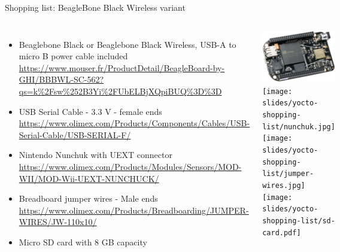 \begin{frame}[fragile]{Shopping list: BeagleBone Black Wireless variant}
  \begin{columns}
    \begin{itemize}
    \item Beaglebone Black or Beaglebone Black Wireless, USB-A to
      micro B power cable included
      {\fontsize{6}{6}\selectfont
        \url{https://www.mouser.fr/ProductDetail/BeagleBoard-by-GHI/BBBWL-SC-562?qs=k%2Fsw%252B3Yi%2FUbELBjXQpiBUQ%3D%3D}
      }
    \item USB Serial Cable - 3.3 V - female ends
      {\fontsize{6}{6}\selectfont
        \url{https://www.olimex.com/Products/Components/Cables/USB-Serial-Cable/USB-SERIAL-F/}
      }
    \item Nintendo Nunchuk with UEXT connector
      {\fontsize{6}{6}\selectfont
        \url{https://www.olimex.com/Products/Modules/Sensors/MOD-WII/MOD-Wii-UEXT-NUNCHUCK/}
      }
    \item Breadboard jumper wires - Male ends
      {\fontsize{6}{6}\selectfont
        \url{https://www.olimex.com/Products/Breadboarding/JUMPER-WIRES/JW-110x10/}
      }
    \item Micro SD card with 8 GB capacity
    \end{itemize}
    \begin{center}
      \includegraphics[height=0.2\textheight]{slides/beagleboneblack-board/beagleboneblack.png} \\
      \texttt{[image: slides/yocto-shopping-list/nunchuk.jpg]} \\
      \texttt{[image: slides/yocto-shopping-list/jumper-wires.jpg]} \\
      \texttt{[image: slides/yocto-shopping-list/sd-card.pdf]}
    \end{center}
  \end{columns}
\end{frame}

